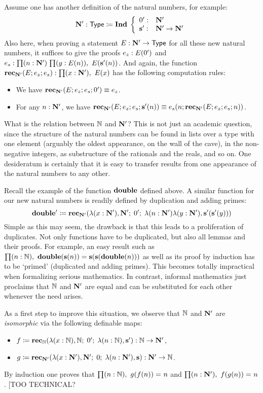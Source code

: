 Assume one has another definition of the natural numbers, for example:  
\[  \mathbf{N'} : \mathsf{Type} \coloneqq \mathbf{Ind \;} \left\{ 
\begin{array}{ll}
0' : & \mathbf{N'} \\
\mathbf{s'} : & \mathbf{N'} \to \mathbf{N'}
\end{array}
\right. \]
Also here, when proving a statement $E : \mathbf{N'} \to \mathsf{Type}$ for all these new natural numbers, it suffices to give the proofs $e_z : E(0')$ and $e_s : \prd{n : \natp}{y : E(n)} E(\Sp(n))$. And again, the function $\rec_\natp(E;e_z;e_s) : \prd{x:\natp} E(x)$
has the following computation rules:
\begin{itemize}
\item We have $\mathbf{rec}_\mathbf{N'}(E;e_z;e_s;0') \equiv e_z$.
\item For any $n : \mathbf{N'}$, we have $\mathbf{rec}_\mathbf{N'}(E;e_z;e_s;\mathbf{s'}(n)) \equiv e_s(n;\mathbf{rec}_\mathbf{N'}(E;e_z;e_s;n))$.
\end{itemize}
What is the relation between $\mathbb{N}$ and $\mathbf{N'}$?
This is not just an academic question, since the structure of the natural numbers
can be found in lists over a type with one element (arguably the oldest appearance,
on the wall of the cave), in the non-negative integers, as substructure of the
rationals and the reals, and so on. One desideratum is certainly that it is easy to
transfer results from one appearance of the natural numbers to any other.

Recall the example of the function $\mathbf{double}$ defined above. A similar function
for our new natural numbers is readily defined by duplication and adding primes:
\[ \mathbf{double'} \coloneqq \mathbf{rec}_\mathbf{N'}(\lambda(x :\mathbf{N'}), \mathbf{N'}; \; 0'; \;  \lambda(n: \mathbf{N'}) \lambda (y:\mathbf{N'}), \mathbf{s'}(\mathbf{s'}(y))) \]
Simple as this may seem, the drawback is that this leads to a
proliferation of duplicates. Not only functions have to be
duplicated, but also all lemmas and their proofs. For example,
an easy result such as  $\prd{n : \nat} \dbl(\s(n))=\s(\s(\dbl(n)))$ as well
as its proof by induction has to be `primed' (duplicated and adding primes).
This becomes totally impractical when formalizing serious mathematics.
In contrast, informal mathematics just proclaims that $\mathbb{N}$ and $\mathbf{N'}$ are
equal and can be substituted for each other whenever the need arises.

As a first step to improve this situation, we observe that $\mathbb{N}$ and $\mathbf{N'}$ are
\emph{isomorphic} via the following definable maps:
\begin{itemize}
\item $f \coloneqq \mathbf{rec}_\mathbb{N}(\lambda(x :\mathbb{N}), \mathbb{N}; \; 0'; \;  \lambda(n: \mathbb{N}), \mathbf{s'})
       : \mathbb{N} \to\mathbf{N'}$, 
\item $g \coloneqq \mathbf{rec}_\mathbf{N'}(\lambda(x :\mathbf{N'}), \mathbf{N'}; \; 0; \;  \lambda(n: \mathbf{N'}), \mathbf{s})
       : \mathbf{N'} \to\mathbb{N}$.
\end{itemize}
By induction one proves that $\prd{n : \nat} \id{g(f(n))}{n}$ 
and $\prd{n : \natp} \id{f(g(n))}{n}$. 
[TOO TECHNICAL?

